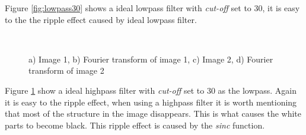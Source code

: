 \documentclass[a4paper, 10pt, final]{article}
\begin{document}
Figure \ref{fig:lowpass30} shows a ideal lowpass filter with
\textit{cut-off} set to $30$, it is easy to the the ripple effect
caused by ideal lowpass filter.

\begin{figure}[!htbp]
  \centering
   \
   \\
  \caption{a) Image 1, b) Fourier transform of image 1, c) Image 2, d) Fourier transform of image 2}
  \label{fig:highpass30}
\end{figure}

Figure \ref{fig:highpass30} show a ideal highpass filter with
\textit{cut-off} set to $30$ as the lowpass. Again it is easy to the
ripple effect, when using a highpass filter it is worth mentioning
that most of the structure in the image disappears. This is what
causes the white parts to become black. This ripple effect is caused
by the \emph{sinc} function.
\end{document}
